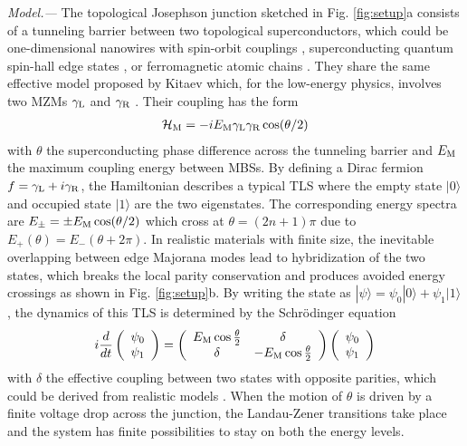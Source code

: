 \documentclass[aps,prl,twocolumn,showpacs,showpacs,10pt,superscriptaddress]{revtex4-1}
\begin{document}
{\it Model.---}
The topological Josephson junction sketched in Fig. \ref{fig:setup}a consists of a tunneling barrier between two topological superconductors, which could be one-dimensional nanowires with spin-orbit couplings \cite{marcus16}, superconducting quantum spin-hall edge states \cite{kouwenhoven15}, or ferromagnetic atomic chains \cite{yazdani14}. They share the same effective model proposed by Kitaev which, for the low-energy physics, involves two MZMs $\gamma_{\rm L}$ and $\gamma_{\rm R}$ \cite{kitaev01}. Their coupling has the form \cite{fuprb09}
\begin{eqnarray}\label{eq:MJE}
\mathcal{H}_{\rm M} = -i E_{\rm M} \gamma_{\rm L}\gamma_{\rm R}\cos({\theta}/{2})
\end{eqnarray}
with $\theta$ the superconducting phase difference across the tunneling barrier and $E_{\rm M}$ the maximum coupling energy between MBSs. By defining a Dirac fermion $f = \gamma_{\rm L} + i \gamma_{\rm R}$, the Hamiltonian describes a typical TLS where the empty state $|0\rangle$ and occupied state $|1\rangle$ are the two eigenstates. The corresponding energy spectra are $E_{\pm} = \pm E_{\rm M} \cos({\theta}/{2})$ which cross at $\theta = (2n+1)\pi$ due to $E_{+}(\theta) = E_{-}(\theta + 2\pi)$. In realistic materials with finite size, the inevitable overlapping between edge Majorana modes lead to hybridization of the two states, which breaks the local parity conservation and produces avoided energy crossings as shown in Fig. \ref{fig:setup}b. By writing the state as $|\psi \rangle = \psi_0  |0\rangle +  \psi_1  |1\rangle$, the dynamics of this TLS is determined by the Schr\"{o}dinger equation
\begin{eqnarray}\label{eq:SE}
i \frac{d}{dt} \left(\begin{array}{cc}
\psi_0  \\
\psi_1
\end{array}\right) = \left(\begin{array}{cc}
E_{\rm M}\cos{\frac{\theta}{2}} & \delta\\
\delta & -E_{\rm M}\cos{\frac{\theta}{2}}
\end{array}\right) \left(\begin{array}{cc}
\psi_0  \\
\psi_1
\end{array}\right)
\end{eqnarray}
with $\delta$ the effective coupling between two states with opposite parities, which could be derived from realistic models \cite{supplement}. When the motion of $\theta$ is driven by a finite voltage drop across the junction, the Landau-Zener transitions take place and the system has finite possibilities to stay on both the energy levels.
\end{document}
